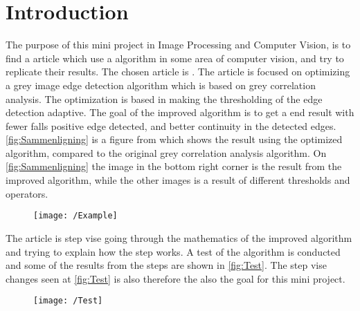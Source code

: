 \section{Introduction}
\label{Introduction}
The purpose of this mini project in Image Processing and Computer Vision, is to find a article which use a algorithm in some area of computer vision, and try to replicate their results. The chosen article is \parencite{Baoming2016}. The article is focused on optimizing a grey image edge detection algorithm which is based on grey correlation analysis. The optimization is based in making the thresholding of the edge detection adaptive. The goal of the improved algorithm is to get a end result with fewer falls positive edge detected, and better continuity in the detected edges. \autoref{fig:Sammenligning} is a figure from \parencite{Baoming2016} which shows the result using the optimized algorithm, compared to the original grey correlation analysis algorithm. On \autoref{fig:Sammenligning} the image in the bottom right corner is the result from the improved algorithm, while the other images is a result of different thresholds and operators.

\begin{figure}[H]
	\centering
	\texttt{[image: /Example]}
	\caption{}
	\label{fig:Sammenligning}
\end{figure}
\noindent

The article is step vise going through the mathematics of the improved algorithm and trying to explain how the step works. A test of the algorithm is conducted and some of the results from the steps are shown in \autoref{fig:Test}. The step vise changes seen at \autoref{fig:Test} is also therefore the also the goal for this mini project.
\begin{figure}[H]
	\centering
	\texttt{[image: /Test]}
	\caption{}
	\label{fig:Test}
\end{figure}
\noindent
